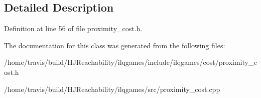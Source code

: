 \subsection{Detailed Description}


Definition at line 56 of file proximity\+\_\+cost.\+h.



The documentation for this class was generated from the following files\+:\begin{DoxyCompactItemize}
\item 
/home/travis/build/\+H\+J\+Reachability/ilqgames/include/ilqgames/cost/proximity\+\_\+cost.\+h\item 
/home/travis/build/\+H\+J\+Reachability/ilqgames/src/proximity\+\_\+cost.\+cpp\end{DoxyCompactItemize}
